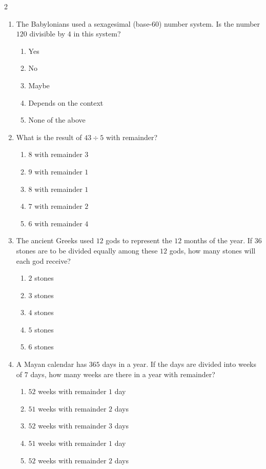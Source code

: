 \documentclass[10pt]{article}
\begin{document}
\begin{multicols}{2}
\begin{enumerate}[label=\textbf{Q\arabic*.}, leftmargin=*, itemsep=6pt, parsep=0pt]
  \item \small The Babylonians used a sexagesimal (base-$60$) number system. Is the number $120$ divisible by $4$ in this system?
  \begin{enumerate}[label=(\Alph*), leftmargin=0.6cm, nosep, itemsep=2pt]
    \item Yes
    \item No
    \item Maybe
    \item Depends on the context
    \item None of the above
  \end{enumerate}

  \item \small What is the result of $43 \div 5$ with remainder?
  \begin{enumerate}[label=(\Alph*), leftmargin=0.6cm, nosep, itemsep=2pt]
    \item $8$ with remainder $3$
    \item $9$ with remainder $1$
    \item $8$ with remainder $1$
    \item $7$ with remainder $2$
    \item $6$ with remainder $4$
  \end{enumerate}

  \item \small The ancient Greeks used $12$ gods to represent the $12$ months of the year. If $36$ stones are to be divided equally among these $12$ gods, how many stones will each god receive?
  \begin{enumerate}[label=(\Alph*), leftmargin=0.6cm, nosep, itemsep=2pt]
    \item $2$ stones
    \item $3$ stones
    \item $4$ stones
    \item $5$ stones
    \item $6$ stones
  \end{enumerate}

  \item \small A Mayan calendar has $365$ days in a year. If the days are divided into weeks of $7$ days, how many weeks are there in a year with remainder?
  \begin{enumerate}[label=(\Alph*), leftmargin=0.6cm, nosep, itemsep=2pt]
    \item $52$ weeks with remainder $1$ day
    \item $51$ weeks with remainder $2$ days
    \item $52$ weeks with remainder $3$ days
    \item $51$ weeks with remainder $1$ day
    \item $52$ weeks with remainder $2$ days
  \end{enumerate}


\end{enumerate}
\end{multicols}
\end{document}
